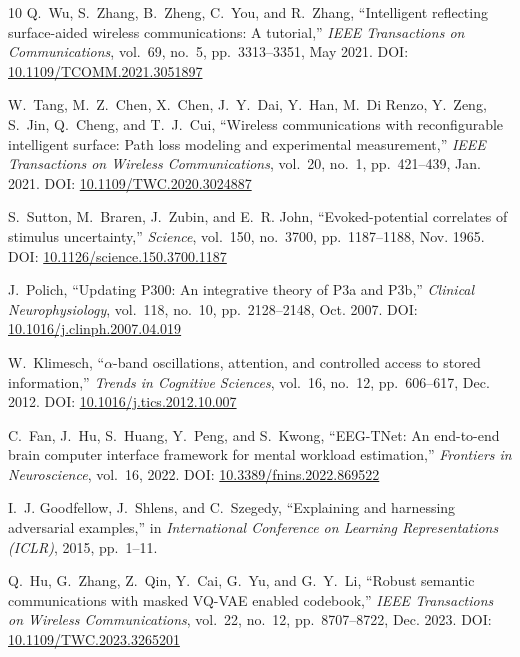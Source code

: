 \documentclass{BVP_CINC}
\begin{document}
\begin{thebibliography}{10}
Q.~Wu, S.~Zhang, B.~Zheng, C.~You, and R.~Zhang, ``Intelligent reflecting surface-aided wireless communications: A tutorial,'' \emph{IEEE Transactions on Communications}, vol.~69, no.~5, pp.~3313--3351, May 2021. DOI: \href{https://doi.org/10.1109/TCOMM.2021.3051897}{10.1109/TCOMM.2021.3051897}

W.~Tang, M.~Z.~Chen, X.~Chen, J.~Y.~Dai, Y.~Han, M.~Di Renzo, Y.~Zeng, S.~Jin, Q.~Cheng, and T.~J.~Cui, ``Wireless communications with reconfigurable intelligent surface: Path loss modeling and experimental measurement,'' \emph{IEEE Transactions on Wireless Communications}, vol.~20, no.~1, pp.~421--439, Jan. 2021. DOI: \href{https://doi.org/10.1109/TWC.2020.3024887}{10.1109/TWC.2020.3024887}

S.~Sutton, M.~Braren, J.~Zubin, and E.~R. John, ``Evoked-potential correlates of stimulus uncertainty,'' \emph{Science}, vol.~150, no.~3700, pp.~1187--1188, Nov. 1965. DOI: \href{https://doi.org/10.1126/science.150.3700.1187}{10.1126/science.150.3700.1187}

J.~Polich, ``Updating P300: An integrative theory of P3a and P3b,'' \emph{Clinical Neurophysiology}, vol.~118, no.~10, pp.~2128--2148, Oct. 2007. DOI: \href{https://doi.org/10.1016/j.clinph.2007.04.019}{10.1016/j.clinph.2007.04.019}

W.~Klimesch, ``$\alpha$-band oscillations, attention, and controlled access to stored information,'' \emph{Trends in Cognitive Sciences}, vol.~16, no.~12, pp.~606--617, Dec. 2012. DOI: \href{https://doi.org/10.1016/j.tics.2012.10.007}{10.1016/j.tics.2012.10.007}

C.~Fan, J.~Hu, S.~Huang, Y.~Peng, and S.~Kwong, ``EEG-TNet: An end-to-end brain computer interface framework for mental workload estimation,'' \emph{Frontiers in Neuroscience}, vol.~16, 2022. DOI: \href{https://doi.org/10.3389/fnins.2022.869522}{10.3389/fnins.2022.869522}

I.~J. Goodfellow, J.~Shlens, and C.~Szegedy, ``Explaining and harnessing adversarial examples,'' in \emph{International Conference on Learning Representations (ICLR)}, 2015, pp.~1--11.

Q.~Hu, G.~Zhang, Z.~Qin, Y.~Cai, G.~Yu, and G.~Y.~Li, ``Robust semantic communications with masked VQ-VAE enabled codebook,'' \emph{IEEE Transactions on Wireless Communications}, vol.~22, no.~12, pp.~8707--8722, Dec. 2023. DOI: \href{https://doi.org/10.1109/TWC.2023.3265201}{10.1109/TWC.2023.3265201}


\end{thebibliography}
\end{document}
